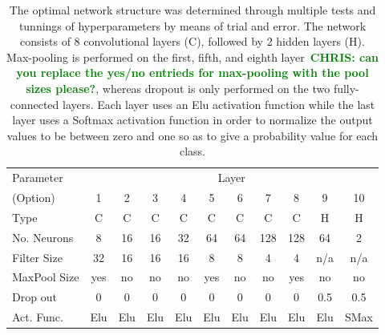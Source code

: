 \documentclass[%
 amsmath,amssymb,
 aps,
 twocolumn,
 prl,
 reprint,
floatfix,
]{revtex4-1}
\newcommand{\chris}[1]{\textbf{\textcolor{green}{CHRIS: #1}}}
\begin{document}
\begin{table}[]
\begin{tabular}{lcccccccccc}
\hline
\hline
Parameter & \multicolumn{10}{c}{Layer}\\
\cline{2-11}
(Option) & 1 & 2 & 3 & 4 & 5 & 6 & 7 & 8 & 9 & 10 \\
\hline
Type & C & C & C & C & C & C & C & C & H & H \\
No. Neurons  & 8  & 16  & 16 & 32 & 64 & 64 & 128 & 128 & 64  & 2  \\
Filter Size  & 32 & 16  & 16 & 16 & 8  & 8  & 4   & 4   & n/a & n/a \\
MaxPool Size & yes & no & no & no & yes & no & no & yes & no & no \\
Drop out  & 0 & 0 & 0 & 0 & 0 & 0 & 0 & 0 & 0.5 & 0.5 \\
Act. Func. & Elu & Elu & Elu & Elu & Elu & Elu & Elu & Elu & Elu & SMax \\
\hline
\end{tabular}
\caption{The optimal network structure was determined through multiple tests
and tunnings of hyperparameters by means of trial and error. The network
consists of 8 convolutional layers (C), followed by 2 hidden layers (H).
Max-pooling is performed on the first, fifth, and eighth layer~\chris{can you
replace the yes/no entrieds for max-pooling with the pool sizes please?},
whereas dropout is only performed on the two fully-connected layers. Each layer
uses an Elu activation function while the last layer uses a Softmax activation
function in order to normalize the output values to be between zero and one so
as to give a probability value for each class.\label{table:network}}
\end{table}
\end{document}
